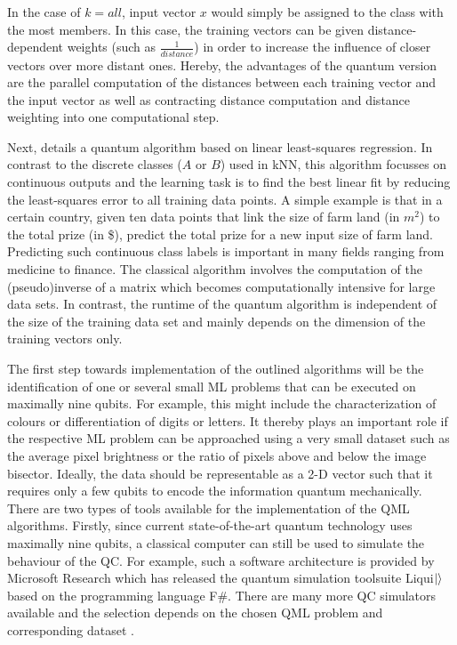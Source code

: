 \documentclass[a4paper]{article}
\newcommand*{\0}{$\ket{0}$}
\newcommand*{\1}{$\ket{1}$}
\begin{document}
In the case of $k = all$, input vector $x$ would simply be assigned to the class with the most members. In this case, the training vectors can be given distance-dependent weights (such as $\frac{1}{distance}$) in order to increase the influence of closer vectors over more distant ones. Hereby, the advantages of the quantum version are the parallel computation of the distances between each training vector and the input vector as well as contracting distance computation and distance weighting into one computational step.

Next, \cite{Schuld2016} details a quantum algorithm based on linear least-squares regression. In contrast to the discrete classes ($A$ or $B$) used in kNN, this algorithm focusses on continuous outputs and the learning task is to find the best linear fit by reducing the least-squares error to all training data points. A simple example is that in a certain country, given ten data points that link the size of farm land (in ${m}^{2}$) to the total prize (in \$), predict the total prize for a new input size of farm land. Predicting such continuous class labels is important in many fields ranging from medicine to finance. The classical algorithm involves the computation of the (pseudo)inverse of a matrix which becomes computationally intensive for large data sets. In contrast, the runtime of the quantum algorithm is independent of the size of the training data set and mainly depends on the dimension of the training vectors only.

The first step towards implementation of the outlined algorithms will be the identification of one or several small ML problems that can be executed on maximally nine qubits. For example, this might include the characterization of colours or differentiation of digits or letters. It thereby plays an important role if the respective ML problem can be approached using a very small dataset such as the average pixel brightness or the ratio of pixels above and below the image bisector. Ideally, the data should be representable as a 2-D vector such that it requires only a few qubits to encode the information quantum mechanically.
\newpage
There are two types of tools available for the implementation of the QML algorithms. Firstly, since current state-of-the-art quantum technology uses maximally nine qubits, a classical computer can still be used to simulate the behaviour of the QC. For example, such a software architecture is provided by Microsoft Research which has released the quantum simulation toolsuite Liqui$\ket{}$ based on the programming language F\#. There are many more QC simulators available and the selection depends on the chosen QML problem and corresponding dataset \citep{quantiki}.
\end{document}
